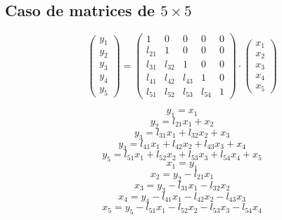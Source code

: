 \documentclass[10pt,a4paper,dvipdfmx]{article}
\begin{document}
\subsection{Caso de matrices de $5\times 5$ }
$$ \left( 
\begin{array}{c}
y_{1} \\
y_{2} \\
y_{3} \\
y_{4} \\
y_{5} 
 \end{array}
\right)
 = \left( 
\begin{array}{ccccc}
1 & 0 & 0 & 0 & 0 \\
l_{{2}{1}} & 1 & 0 & 0 & 0 \\
l_{{3}{1}} & l_{{3}{2}} & 1 & 0 & 0 \\
l_{{4}{1}} & l_{{4}{2}} & l_{{4}{3}} & 1 & 0 \\
l_{{5}{1}} & l_{{5}{2}} & l_{{5}{3}} & l_{{5}{4}} & 1 
 \end{array}
\right)
 \cdot \left( 
\begin{array}{c}
x_{1} \\
x_{2} \\
x_{3} \\
x_{4} \\
x_{5} 
 \end{array}
\right)
 $$
\begin{multicols}{2}
$$ y_{1} = x_{1} $$
$$ y_{2} = l_{{2}{1}} x_{1} + x_{2} $$
$$ y_{3} = l_{{3}{1}} x_{1} + l_{{3}{2}} x_{2} + x_{3} $$
$$ y_{4} = l_{{4}{1}} x_{1} + l_{{4}{2}} x_{2} + l_{{4}{3}} x_{3} + x_{4} $$
$$ y_{5} = l_{{5}{1}} x_{1} + l_{{5}{2}} x_{2} + l_{{5}{3}} x_{3} + l_{{5}{4}} x_{4} + x_{5} $$
\vfill\null
\columnbreak
$$ x_{1} = y_{1} $$
$$ x_{2} = y_{2}- l_{{2}{1}} x_{1} $$
$$ x_{3} = y_{3}- l_{{3}{1}} x_{1}- l_{{3}{2}} x_{2} $$
$$ x_{4} = y_{4}- l_{{4}{1}} x_{1}- l_{{4}{2}} x_{2}- l_{{4}{3}} x_{3} $$
$$ x_{5} = y_{5}- l_{{5}{1}} x_{1}- l_{{5}{2}} x_{2}- l_{{5}{3}} x_{3}- l_{{5}{4}} x_{4} $$
\end{multicols}
\end{document}
